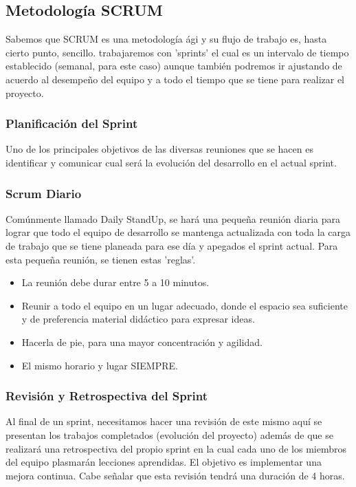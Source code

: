 \subsection{Metodología SCRUM}
Sabemos que SCRUM es una metodología ági y su flujo de trabajo es, hasta cierto punto, sencillo. trabajaremos con 'sprints' el cual es un intervalo de tiempo establecido (semanal, para este caso) aunque también podremos ir ajustando de acuerdo al desempeño del equipo y a todo el tiempo que se tiene para realizar el proyecto. 
\subsubsection{Planificación del Sprint}
Uno de los principales objetivos de las diversas reuniones que se hacen es identificar y comunicar cual será la evolución del desarrollo en el actual sprint.
\subsubsection {Scrum Diario} 
Comúnmente llamado Daily StandUp, se hará una pequeña reunión diaria para lograr que todo el equipo de desarrollo se mantenga actualizada con toda la carga de trabajo que se tiene planeada para ese día y apegados el sprint actual. Para esta pequeña reunión, se tienen estas 'reglas'. 
\begin{itemize}
	\item La reunión debe durar entre 5 a 10 minutos. 
	\item Reunir a todo el equipo en un lugar adecuado, donde el espacio sea suficiente y de preferencia material didáctico para expresar ideas. 
	\item Hacerla de pie, para una mayor concentración y agilidad.
	\item El mismo horario y lugar SIEMPRE. 
\end{itemize}
\subsubsection{Revisión y Retrospectiva del Sprint}
Al final de un sprint, necesitamos hacer una revisión de este mismo aquí se presentan los trabajos completados (evolución del proyecto) además de que se realizará una retrospectiva del propio sprint en la cual cada uno de los miembros del equipo plasmarán lecciones aprendidas. El objetivo es implementar una mejora continua. Cabe señalar que esta revisión tendrá una duración de 4 horas. 
